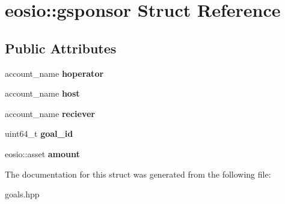 \hypertarget{structeosio_1_1gsponsor}{}\section{eosio\+:\+:gsponsor Struct Reference}
\label{structeosio_1_1gsponsor}
\subsection*{Public Attributes}
\begin{DoxyCompactItemize}
\item 
\mbox{\label{structeosio_1_1gsponsor_aaf400c4d241c8ff9b16debbf1e7ae513}} 
account\+\_\+name {\bfseries hoperator}
\item 
\mbox{\label{structeosio_1_1gsponsor_a6e49508ffb2e1246bc68aab03b319183}} 
account\+\_\+name {\bfseries host}
\item 
\mbox{\label{structeosio_1_1gsponsor_a0dc0921c89d065374c74bcc89c8bc47a}} 
account\+\_\+name {\bfseries reciever}
\item 
\mbox{\label{structeosio_1_1gsponsor_ab639a51a34e3ec788c0e3e60b82e2c5f}} 
uint64\+\_\+t {\bfseries goal\+\_\+id}
\item 
\mbox{\label{structeosio_1_1gsponsor_a8c1932a8fb80d515bdcb3723f26c5bf1}} 
eosio\+::asset {\bfseries amount}
\end{DoxyCompactItemize}


The documentation for this struct was generated from the following file\+:\begin{DoxyCompactItemize}
\item 
goals.\+hpp\end{DoxyCompactItemize}
